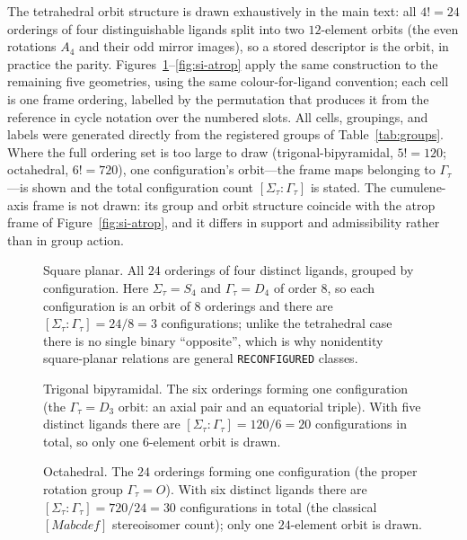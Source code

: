 \documentclass[pdflatex,sn-mathphys-num,referee,lineno]{sn-jnl}
\newcommand{\code}[1]{\texttt{#1}}
\theoremstyle{plain}
\theoremstyle{remark}
\theoremstyle{definition}
\begin{document}
The tetrahedral orbit structure is drawn exhaustively in the main text: all
\(4!=24\) orderings of four distinguishable ligands split into two
\(12\)-element orbits (the even rotations \(A_4\) and their odd mirror images),
so a stored descriptor is the orbit, in practice the parity.
Figures~\ref{fig:si-square}--\ref{fig:si-atrop} apply the same construction to
the remaining five geometries, using the same colour-for-ligand convention;
each cell is one frame ordering, labelled by the permutation that produces it
from the reference in cycle notation over the numbered slots.  All cells,
groupings, and labels were generated directly from the registered groups of
Table~\ref{tab:groups}.  Where the full ordering set is too large to draw
(trigonal-bipyramidal, \(5!=120\); octahedral, \(6!=720\)), one
configuration's orbit---the frame maps belonging to \(\Gamma_\tau\)---is shown
and the total configuration count \([\Sigma_\tau:\Gamma_\tau]\) is stated.
The cumulene-axis frame is not drawn: its group and orbit structure coincide
with the atrop frame of Figure~\ref{fig:si-atrop}, and it differs in support
and admissibility rather than in group action.

\begin{figure}[htbp]
  \centering
  \resizebox{0.72\textwidth}{!}{}
  \caption{Square planar.  All \(24\) orderings of four distinct ligands,
  grouped by configuration.  Here \(\Sigma_\tau=S_4\) and
  \(\Gamma_\tau=D_4\) of order \(8\), so each configuration is an orbit of
  \(8\) orderings and there are \([\Sigma_\tau:\Gamma_\tau]=24/8=3\)
  configurations; unlike the tetrahedral case there is no single binary
  ``opposite'', which is why nonidentity square-planar relations are general
  \code{RECONFIGURED} classes.}
  \label{fig:si-square}
\end{figure}

\begin{figure}[htbp]
  \centering
  \resizebox{0.62\columnwidth}{!}{}
  \caption{Trigonal bipyramidal.  The six orderings forming one configuration
  (the \(\Gamma_\tau=D_3\) orbit: an axial pair and an equatorial triple).
  With five distinct ligands there are
  \([\Sigma_\tau:\Gamma_\tau]=120/6=20\) configurations in total, so only one
  \(6\)-element orbit is drawn.}
  \label{fig:si-tbp}
\end{figure}

\begin{figure}[htbp]
  \centering
  \resizebox{\textwidth}{!}{}
  \caption{Octahedral.  The \(24\) orderings forming one configuration (the
  proper rotation group \(\Gamma_\tau=O\)).  With six distinct ligands there
  are \([\Sigma_\tau:\Gamma_\tau]=720/24=30\) configurations in total (the
  classical \([Mabcdef]\) stereoisomer count); only one \(24\)-element orbit is
  drawn.}
  \label{fig:si-oct}
\end{figure}
\end{document}
